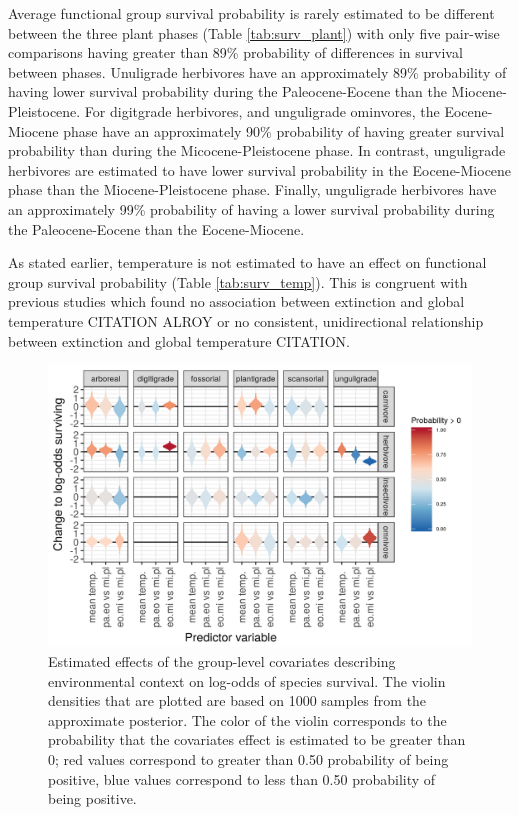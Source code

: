 \documentclass[12pt,letterpaper]{article}
\begin{document}
Average functional group survival probability is rarely estimated to be different between the three plant phases (Table \ref{tab:surv_plant}) with only five pair-wise comparisons having greater than 89\% probability of differences in survival between phases. Unuligrade herbivores have an approximately 89\% probability of having lower survival probability during the Paleocene-Eocene than the Miocene-Pleistocene. For digitgrade herbivores, and unguligrade ominvores, the Eocene-Miocene phase have an approximately 90\% probability of having greater survival probability than during the Micocene-Pleistocene phase. In contrast, unguligrade herbivores are estimated to have lower survival probability in the Eocene-Miocene phase than the Miocene-Pleistocene phase. Finally, unguligrade herbivores have an approximately 99\% probability of having a lower survival probability during the Paleocene-Eocene than the Eocene-Miocene.

As stated earlier, temperature is not estimated to have an effect on functional group survival probability (Table \ref{tab:surv_temp}). This is congruent with previous studies which found no association between extinction and global temperature CITATION ALROY or no consistent, unidirectional relationship between extinction and global temperature CITATION. 

\begin{figure}[ht]
  \centering
  \includegraphics[width=\textwidth,height=0.4\textheight,keepaspectratio=true]{figure/group_on_survival_bd}
  \caption{Estimated effects of the group-level covariates describing environmental context on log-odds of species survival. The violin densities that are plotted are based on 1000 samples from the approximate posterior. The color of the violin corresponds to the probability that the covariates effect is estimated to be greater than 0; red values correspond to greater than 0.50 probability of being positive, blue values correspond to less than 0.50 probability of being positive.} 
  \label{fig:group_surv_bd}
\end{figure}
\end{document}
